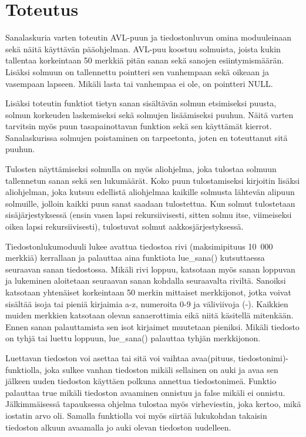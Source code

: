 \documentclass[12pt,a4paper,titlepage]{article}
\begin{document}
\section{Toteutus}
Sanalaskuria varten toteutin AVL-puun ja tiedostonluvun omina moduuleinaan sekä näitä käyttävän pääohjelman. AVL-puu koostuu solmuista, joista kukin tallentaa korkeintaan 50 merkkiä pitän sanan sekä sanojen esiintymismäärän. Lisäksi solmuun on tallennettu pointteri sen vanhempaan sekä oikeaan ja vasempaan lapseen. Mikäli lasta tai vanhempaa ei ole, on pointteri NULL.

Lisäksi toteutin funktiot tietyn sanan sisältävän solmun etsimiseksi puusta, solmun korkeuden laskemiseksi sekä solmujen lisäämiseksi puuhun. Näitä varten tarvitsin myös puun tasapainottavan funktion sekä sen käyttämät kierrot. Sanalaskurissa solmujen poistaminen on tarpeetonta, joten en toteuttanut sitä puuhun.

Tulosten näyttämiseksi solmulla on myös aliohjelma, joka tulostaa solmuun tallennetun sanan sekä sen lukumäärät. Koko puun tulostamiseksi kirjoitin lisäksi aliohjelman, joka kutsuu edellistä aliohjelmaa kaikille solmusta lähtevän alipuun solmuille, jolloin kaikki puun sanat saadaan tulostettua. Kun solmut tulostetaan sisäjärjestyksessä (ensin vasen lapsi rekursiivisesti, sitten solmu itse, viimeiseksi oikea lapsi rekursiivisesti), tulostuvat solmut aakkosjärjestyksessä.

Tiedostonlukumoduuli lukee avattua tiedostoa rivi (maksimipituus 10~000 merkkiä) kerrallaan ja palauttaa aina funktiota lue\_sana() kutsuttaessa seuraavan sanan tiedostossa. Mikäli rivi loppuu, katsotaan myös sanan loppuvan ja lukeminen aloitetaan seuraavan sanan kohdalla seuraavalta riviltä. Sanoiksi katsotaan yhtenäiset korkeintaan 50 merkin mittaiset merkkijonot, jotka voivat sisältää isoja tai pieniä kirjaimia a-z, numeroita 0-9 ja väliviivoja (-). Kaikkien muiden merkkien katsotaan olevan sanaerottimia eikä niitä käsitellä mitenkään. Ennen sanan palauttamista sen isot kirjaimet muutetaan pieniksi. Mikäli tiedosto on tyhjä tai luettu loppuun, lue\_sana() palauttaa tyhjän merkkijonon.

Luettavan tiedoston voi asettaa tai sitä voi vaihtaa avaa(pituus, tiedostonimi)-funktiolla, joka sulkee vanhan tiedoston mikäli sellainen on auki ja avaa sen jälkeen uuden tiedoston käyttäen polkuna annettua tiedostonimeä. Funktio palauttaa true mikäli tiedoston avaaminen onnistuu ja false mikäli ei onnistu. Jälkimmäisessä tapauksessa ohjelma tulostaa myös virheviestin, joka kertoo, mikä iostatin arvo oli. Samalla funktiolla voi myös siirtää lukukohdan takaisin tiedoston alkuun avaamalla jo auki olevan tiedoston uudelleen.
\end{document}
